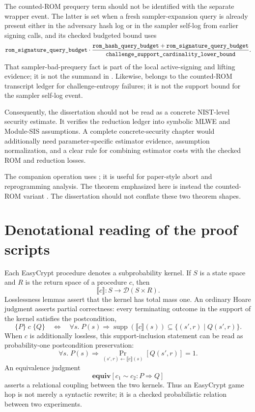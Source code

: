 The counted-ROM prequery term should not be identified with the separate
 wrapper event.  The latter is set when a fresh
sampler-expansion query is already present either in the adversary hash log or
in the sampler self-log from earlier signing calls, and its checked budgeted
bound uses
\[
  \texttt{rom\_signature\_query\_budget}
  \cdot
  \frac{\texttt{rom\_hash\_query\_budget}+
        \texttt{rom\_signature\_query\_budget}}
       {\texttt{challenge\_support\_cardinality\_lower\_bound}}.
\]
That sampler-bad-prequery fact is part of the local active-signing and lifting
evidence; it is not the  summand in
.
Likewise,  belongs to the counted-ROM
transcript ledger for challenge-entropy failures; it is not the support bound
for the sampler self-log event.

Consequently, the dissertation should not be read as a concrete NIST-level
security estimate.  It verifies the reduction ledger into symbolic MLWE and
Module-SIS assumptions.  A complete concrete-security chapter would additionally
need parameter-specific estimator evidence, assumption normalization, and a
clear rule for combining estimator costs with the checked ROM and reduction
losses.

The companion operation  uses
; it is useful for paper-style abort and
reprogramming analysis.  The theorem emphasized here is instead the counted-ROM
variant .  The dissertation should not
conflate these two theorem shapes.

\section{Denotational reading of the proof scripts}
\label{sec:synthesis-denotational-final}

Each EasyCrypt procedure denotes a subprobability kernel.  If \(S\) is a state
space and \(R\) is the return space of a procedure \(c\), then
\[
  \llbracket c\rrbracket:S\to\mathcal{D}(S\times R).
\]
Losslessness lemmas assert that the kernel has total mass one.  An ordinary
Hoare judgment asserts partial correctness: every terminating outcome in the
support of the kernel satisfies the postcondition,
\[
  \{P\}\;c\;\{Q\}
  \quad\Longleftrightarrow\quad
  \forall s.\;P(s)\Rightarrow
  \operatorname{supp}(\llbracket c\rrbracket(s))
  \subseteq
  \{(s',r)\mid Q(s',r)\}.
\]
When \(c\) is additionally lossless, this support-inclusion statement can be
read as probability-one postcondition preservation:
\[
  \forall s.\;P(s)\Rightarrow
  \Pr_{(s',r)\leftarrow\llbracket c\rrbracket(s)}[Q(s',r)]=1.
\]
An equivalence judgment
\[
  \mathbf{equiv}[c_1\sim c_2:P\Rightarrow Q]
\]
asserts a relational coupling between the two kernels.  Thus an EasyCrypt game
hop is not merely a syntactic rewrite; it is a checked probabilistic relation
between two experiments.

